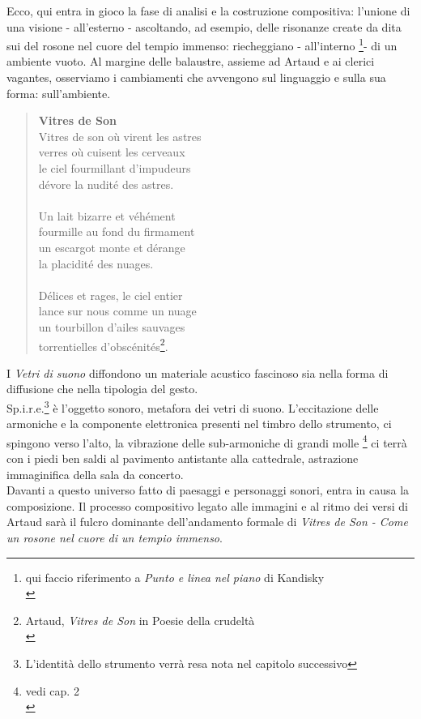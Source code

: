 Ecco, qui entra in gioco la fase di analisi e la costruzione compositiva: l'unione di una visione - all'esterno - ascoltando, ad esempio, delle risonanze create da dita sui del rosone nel cuore del tempio immenso: riecheggiano - all'interno \footnote{qui faccio riferimento a \textit{Punto e linea nel piano} di Kandisky \\}- di un ambiente vuoto.
Al margine delle balaustre, assieme ad Artaud e ai clerici vagantes, osserviamo i cambiamenti che avvengono sul linguaggio e sulla sua forma: sull'ambiente. \\
\begin{quotation}
\textbf{Vitres de Son} \\
Vitres de son où virent les astres \\
verres où cuisent les cerveaux \\
le ciel fourmillant d'impudeurs \\
dévore la nudité des astres. \\ \\ 
Un lait bizarre et véhément \\
fourmille au fond du firmament \\
un escargot monte et dérange \\
la placidité des nuages. \\ \\ 
Délices et rages, le ciel entier \\
lance sur nous comme un nuage \\
un tourbillon d'ailes sauvages \\
torrentielles d'obscénités\footnote{Artaud, \textit{Vitres de Son} in Poesie della crudeltà \\}. \\
\end{quotation}
I \textit{Vetri di suono} diffondono un materiale acustico fascinoso sia nella forma di diffusione che nella tipologia del gesto. \\
Sp.i.r.e.\footnote{L'identità dello strumento verrà resa nota nel capitolo successivo} è l'oggetto sonoro, metafora dei vetri di suono. L'eccitazione delle armoniche e la componente elettronica presenti nel timbro dello strumento, ci spingono verso l'alto, la vibrazione delle sub-armoniche di grandi molle \footnote{vedi cap. 2 \\} ci terrà con i piedi ben saldi al pavimento antistante alla cattedrale, astrazione immaginifica della sala da concerto. \\
Davanti a questo universo fatto di paesaggi e personaggi sonori, entra in causa la composizione. Il processo compositivo legato alle immagini e al ritmo dei versi di Artaud sarà il fulcro dominante dell'andamento formale di \textit{Vitres de Son - Come un rosone nel cuore di un tempio immenso}.
